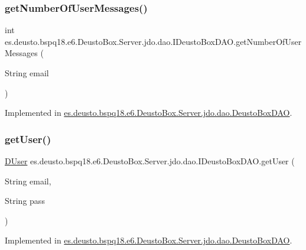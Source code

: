 \subsubsection{\texorpdfstring{get\+Number\+Of\+User\+Messages()}{getNumberOfUserMessages()}}
{\footnotesize\ttfamily int es.\+deusto.\+bspq18.\+e6.\+Deusto\+Box.\+Server.\+jdo.\+dao.\+I\+Deusto\+Box\+D\+A\+O.\+get\+Number\+Of\+User\+Messages (\begin{DoxyParamCaption}\item[{String}]{email }\end{DoxyParamCaption})}



Implemented in \mbox{\hyperlink{classes_1_1deusto_1_1bspq18_1_1e6_1_1_deusto_box_1_1_server_1_1jdo_1_1dao_1_1_deusto_box_d_a_o_a31147274fcf6c6d1f5d63d2b42c43708}{es.\+deusto.\+bspq18.\+e6.\+Deusto\+Box.\+Server.\+jdo.\+dao.\+Deusto\+Box\+D\+AO}}.

\mbox{\label{interfacees_1_1deusto_1_1bspq18_1_1e6_1_1_deusto_box_1_1_server_1_1jdo_1_1dao_1_1_i_deusto_box_d_a_o_a3060dee0eb077bd108326b4b47c57aba}} 
\subsubsection{\texorpdfstring{get\+User()}{getUser()}}
{\footnotesize\ttfamily \mbox{\hyperlink{classes_1_1deusto_1_1bspq18_1_1e6_1_1_deusto_box_1_1_server_1_1jdo_1_1data_1_1_d_user}{D\+User}} es.\+deusto.\+bspq18.\+e6.\+Deusto\+Box.\+Server.\+jdo.\+dao.\+I\+Deusto\+Box\+D\+A\+O.\+get\+User (\begin{DoxyParamCaption}\item[{String}]{email,  }\item[{String}]{pass }\end{DoxyParamCaption})}



Implemented in \mbox{\hyperlink{classes_1_1deusto_1_1bspq18_1_1e6_1_1_deusto_box_1_1_server_1_1jdo_1_1dao_1_1_deusto_box_d_a_o_ad7a2019d707d5698bdb80f4fc7df9248}{es.\+deusto.\+bspq18.\+e6.\+Deusto\+Box.\+Server.\+jdo.\+dao.\+Deusto\+Box\+D\+AO}}.

